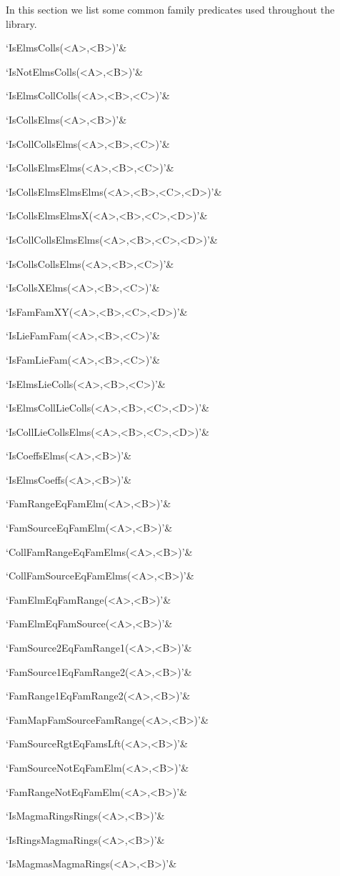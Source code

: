 
In this section we list some common family predicates used throughout the
library.

\beginitems
`IsElmsColls(<A>,<B>)'&

`IsNotElmsColls(<A>,<B>)'&

`IsElmsCollColls(<A>,<B>,<C>)'&

`IsCollsElms(<A>,<B>)'&

`IsCollCollsElms(<A>,<B>,<C>)'&

`IsCollsElmsElms(<A>,<B>,<C>)'&

`IsCollsElmsElmsElms(<A>,<B>,<C>,<D>)'&

`IsCollsElmsElmsX(<A>,<B>,<C>,<D>)'&

`IsCollCollsElmsElms(<A>,<B>,<C>,<D>)'&

`IsCollsCollsElms(<A>,<B>,<C>)'&

`IsCollsXElms(<A>,<B>,<C>)'&

`IsFamFamXY(<A>,<B>,<C>,<D>)'&

`IsLieFamFam(<A>,<B>,<C>)'&

`IsFamLieFam(<A>,<B>,<C>)'&

`IsElmsLieColls(<A>,<B>,<C>)'&

`IsElmsCollLieColls(<A>,<B>,<C>,<D>)'&

`IsCollLieCollsElms(<A>,<B>,<C>,<D>)'&

`IsCoeffsElms(<A>,<B>)'&

`IsElmsCoeffs(<A>,<B>)'&

`FamRangeEqFamElm(<A>,<B>)'&

`FamSourceEqFamElm(<A>,<B>)'&

`CollFamRangeEqFamElms(<A>,<B>)'&

`CollFamSourceEqFamElms(<A>,<B>)'&

`FamElmEqFamRange(<A>,<B>)'&

`FamElmEqFamSource(<A>,<B>)'&

`FamSource2EqFamRange1(<A>,<B>)'&

`FamSource1EqFamRange2(<A>,<B>)'&

`FamRange1EqFamRange2(<A>,<B>)'&

`FamMapFamSourceFamRange(<A>,<B>)'&

`FamSourceRgtEqFamsLft(<A>,<B>)'&

`FamSourceNotEqFamElm(<A>,<B>)'&

`FamRangeNotEqFamElm(<A>,<B>)'&

`IsMagmaRingsRings(<A>,<B>)'&

`IsRingsMagmaRings(<A>,<B>)'&

`IsMagmasMagmaRings(<A>,<B>)'&

\enditems

